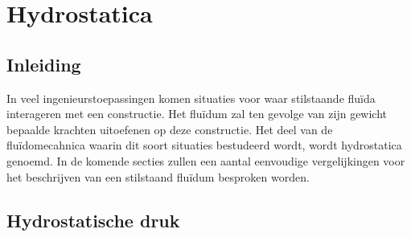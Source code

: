 \chapter{Hydrostatica}
\label{sec:Hydrostatica}

	\section{Inleiding}
	\label{sec:Hydrostatica Inleiding}
In veel ingenieurstoepassingen komen situaties voor waar stilstaande fluïda interageren met een constructie. Het fluïdum zal ten gevolge van zijn gewicht bepaalde krachten uitoefenen op deze constructie. Het deel van de fluïdomecahnica waarin dit soort situaties bestudeerd wordt, wordt hydrostatica genoemd. In de komende secties zullen een aantal eenvoudige vergelijkingen voor het beschrijven van een stilstaand fluïdum besproken worden.

	\section{Hydrostatische druk}
	\label{sec:Hydrostatische druk}
	

